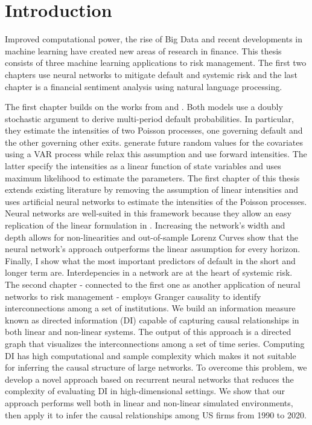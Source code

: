\cleardoublepage
\chapter*{Introduction}

Improved computational power, the rise of Big Data and recent developments in machine learning have created new areas of research in finance. This thesis consists of three machine learning applications to risk management. The first two chapters use neural networks to mitigate default and systemic risk and the last chapter is a financial sentiment analysis using natural language processing.  

The first chapter builds on the works from \citet{DSW} and \citet{Duan2012}. Both models use a doubly stochastic argument to derive multi-period default probabilities. In particular, they estimate the intensities of two Poisson processes, one governing default and the other governing other exits. \citet{DSW} generate future random values for the covariates using a VAR process while \citet{Duan2012} relax this assumption and use forward intensities. The latter specify the intensities as a linear function of state variables and uses maximum likelihood to estimate the parameters. The first chapter of this thesis extends existing literature by removing the assumption of linear intensities and uses artificial neural networks to estimate the intensities of the Poisson processes. Neural networks are well-suited in this framework because they allow an easy replication of the linear formulation in \citet{Duan2012}. Increasing the network's width and depth allows for non-linearities and out-of-sample Lorenz Curves show that the neural network's approach outperforms the linear assumption for every horizon. Finally, I show what the most important predictors of default in the short and longer term are. Interdepencies in a network are at the heart of systemic risk. The second chapter - connected to the first one as another application of neural networks to risk management - employs Granger causality to identify interconnections among a set of institutions. We build an information measure known as directed information (DI) capable of capturing causal relationships in both linear and non-linear systems. The output of this approach is a directed graph that visualizes the interconnections among a set of time series. Computing DI has high computational and sample complexity which makes it not suitable for inferring the causal structure of large networks. To overcome this problem, we develop a novel approach based on recurrent neural networks that reduces the complexity of evaluating DI in high-dimensional settings. We show that our approach performs well both in linear and non-linear simulated environments, then apply it to infer the causal relationships among US firms from 1990 to 2020. \\

